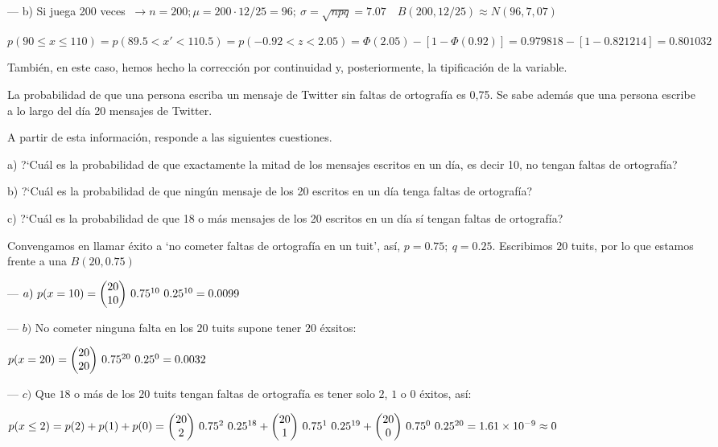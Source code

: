 --- b) Si juega 200 veces $\ \to n=200; \mu=200\cdot 12/25=96; \ \sigma=\sqrt{npq}=7.07 \quad B(200,12/25)\approx N(96,7,07)$

$p(90\le x \le 110)=p(89.5 < x' < 110.5) = p(-0.92<z<2.05)=\Phi(2.05)-[1-\Phi(0.92)]=0.979818-[1-0.821214]=0.801032$

También, en este caso, hemos hecho la corrección por continuidad y, posteriormente, la tipificación de la variable.

\vspace{4mm}
\begin{ejemplo}
\begin{ejer}
	La probabilidad de que una persona escriba un mensaje de Twitter sin faltas de ortografía es 0,75. Se sabe además que una persona escribe a lo largo del día 20 mensajes de Twitter.

A partir de esta información, responde a las siguientes cuestiones. 

a) ?`Cuál es la probabilidad de que exactamente la mitad de los mensajes escritos en un día, es decir 10, no tengan faltas de ortografía?

b) ?`Cuál es la probabilidad de que ningún mensaje de los 20 escritos en un día tenga faltas de ortografía?

c) ?`Cuál es la probabilidad de que 18 o más mensajes de los 20 escritos en un día sí tengan faltas de ortografía?


\end{ejer}
\end{ejemplo}
Convengamos en llamar éxito a `no cometer faltas de ortografía en un tuit', así, $p=0.75; \ q=0.25$. Escribimos $20$ tuits, por lo que estamos frente a una $B(20,0.75)$

--- $a)\ p(x=10)=\mqty(20\\10)\ 0.75^{10}\ 0.25^{10}= 0.0099$

--- $b)$ No cometer ninguna falta en los $20$ tuits supone tener $20$ éxsitos:

$p(x=20) = \mqty(20\\20)\ 0.75^{20}\ 0.25^{0}= 0.0032$

--- $c)$ Que $18$ o más de los $20$ tuits tengan faltas de ortografía es tener solo $2$, $1$ o $0$ éxitos, así:

$p(x\le 2)=p(2)+p(1)+p(0)=\mqty(20\\2)\ 0.75^{2}\ 0.25^{18}+\mqty(20\\1)\ 0.75^{1}\ 0.25^{19}+\mqty(20\\0)\ 0.75^{0}\ 0.25^{20}= 1.61\times 10^{-9}\approx 0$


